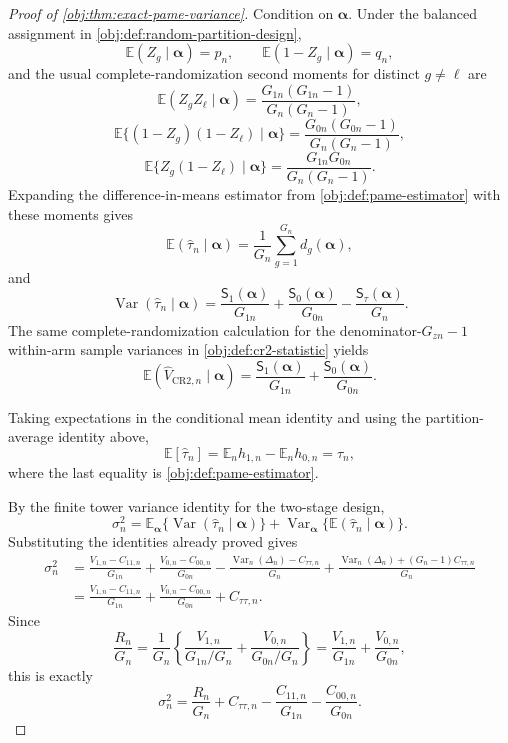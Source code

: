 \begin{proof}[Proof of \cref{obj:thm:exact-pame-variance}]
Condition on \(\boldsymbol\alpha\). Under the balanced assignment in
\cref{obj:def:random-partition-design},
\[
\mathbb E(Z_g\mid\boldsymbol\alpha)=p_n,\qquad
\mathbb E(1-Z_g\mid\boldsymbol\alpha)=q_n,
\]
and the usual complete-randomization second moments for distinct \(g\ne \ell\) are
\[
\mathbb E(Z_gZ_\ell\mid\boldsymbol\alpha)
=\frac{G_{1n}(G_{1n}-1)}{G_n(G_n-1)},
\]
\[
\mathbb E\{(1-Z_g)(1-Z_\ell)\mid\boldsymbol\alpha\}
=\frac{G_{0n}(G_{0n}-1)}{G_n(G_n-1)},
\]
\[
\mathbb E\{Z_g(1-Z_\ell)\mid\boldsymbol\alpha\}
=\frac{G_{1n}G_{0n}}{G_n(G_n-1)}.
\]
Expanding the difference-in-means estimator from \cref{obj:def:pame-estimator} with these moments gives
\[
\mathbb E(\widehat\tau_n\mid\boldsymbol\alpha)
=
\frac1{G_n}\sum_{g=1}^{G_n}d_g(\boldsymbol\alpha),
\]
and
\[
\operatorname{Var}(\widehat\tau_n\mid\boldsymbol\alpha)
=
\frac{\mathsf S_1(\boldsymbol\alpha)}{G_{1n}}
+
\frac{\mathsf S_0(\boldsymbol\alpha)}{G_{0n}}
-
\frac{\mathsf S_\tau(\boldsymbol\alpha)}{G_n}.
\]
The same complete-randomization calculation for the denominator-\(G_{zn}-1\) within-arm sample variances in \cref{obj:def:cr2-statistic} yields
\[
\mathbb E(\widehat V_{\mathrm{CR2},n}\mid\boldsymbol\alpha)
=
\frac{\mathsf S_1(\boldsymbol\alpha)}{G_{1n}}
+
\frac{\mathsf S_0(\boldsymbol\alpha)}{G_{0n}} .
\]

Taking expectations in the conditional mean identity and using the partition-average identity above,
\[
\mathbb E[\widehat\tau_n]
=
\mathbb E_n h_{1,n}-\mathbb E_n h_{0,n}
=
\tau_n,
\]
where the last equality is \cref{obj:def:pame-estimator}. %

By the finite tower variance identity for the two-stage design,
\[
\sigma_n^2
=
\mathbb E_{\boldsymbol\alpha}\{\operatorname{Var}(\widehat\tau_n\mid\boldsymbol\alpha)\}
+
\operatorname{Var}_{\boldsymbol\alpha}\{\mathbb E(\widehat\tau_n\mid\boldsymbol\alpha)\}.
\]
Substituting the identities already proved gives
\[
\begin{aligned}
\sigma_n^2
&=
\frac{V_{1,n}-C_{11,n}}{G_{1n}}
+
\frac{V_{0,n}-C_{00,n}}{G_{0n}}
-
\frac{\operatorname{Var}_n(\Delta_n)-C_{\tau\tau,n}}{G_n}
+
\frac{\operatorname{Var}_n(\Delta_n)+(G_n-1)C_{\tau\tau,n}}{G_n} \\
&=
\frac{V_{1,n}-C_{11,n}}{G_{1n}}
+
\frac{V_{0,n}-C_{00,n}}{G_{0n}}
+
C_{\tau\tau,n}.
\end{aligned}
\]
Since
\[
\frac{R_n}{G_n}
=
\frac1{G_n}
\left\{
\frac{V_{1,n}}{G_{1n}/G_n}
+
\frac{V_{0,n}}{G_{0n}/G_n}
\right\}
=
\frac{V_{1,n}}{G_{1n}}+\frac{V_{0,n}}{G_{0n}},
\]
this is exactly
\[
\sigma_n^2
=
\frac{R_n}{G_n}
+
C_{\tau\tau,n}
-
\frac{C_{11,n}}{G_{1n}}
-
\frac{C_{00,n}}{G_{0n}} .
\]


\end{proof}
